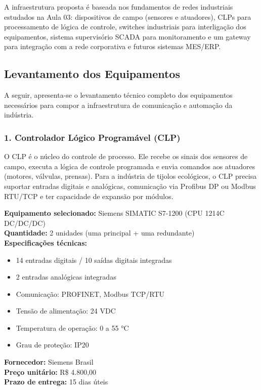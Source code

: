 \documentclass[12pt,a4paper]{article}
\begin{document}
A infraestrutura proposta é baseada nos fundamentos de redes industriais estudados na
Aula 03: dispositivos de campo (sensores e atuadores), CLPs para processamento de lógica
de controle, switches industriais para interligação dos equipamentos, sistema supervisório
SCADA para monitoramento e um gateway para integração com a rede corporativa e futuros
sistemas MES/ERP.

\subsection{Levantamento dos Equipamentos}

A seguir, apresenta-se o levantamento técnico completo dos equipamentos necessários
para compor a infraestrutura de comunicação e automação da indústria.

\subsubsection*{1. Controlador Lógico Programável (CLP)}

O CLP é o núcleo do controle de processo. Ele recebe os sinais dos sensores de campo,
executa a lógica de controle programada e envia comandos aos atuadores (motores,
válvulas, prensas). Para a indústria de tijolos ecológicos, o CLP precisa suportar
entradas digitais e analógicas, comunicação via Profibus DP ou Modbus RTU/TCP e
ter capacidade de expansão por módulos.

\textbf{Equipamento selecionado:} Siemens SIMATIC S7-1200 (CPU 1214C DC/DC/DC)\\
\textbf{Quantidade:} 2 unidades (uma principal + uma redundante)\\
\textbf{Especificações técnicas:}
\begin{itemize}[leftmargin=1.5cm, itemsep=1pt]
    \item 14 entradas digitais / 10 saídas digitais integradas
    \item 2 entradas analógicas integradas
    \item Comunicação: PROFINET, Modbus TCP/RTU
    \item Tensão de alimentação: 24 VDC
    \item Temperatura de operação: 0 a 55 °C
    \item Grau de proteção: IP20
\end{itemize}
\textbf{Fornecedor:} Siemens Brasil\\
\textbf{Preço unitário:} R\$ 4.800,00\\
\textbf{Prazo de entrega:} 15 dias úteis
\end{document}
